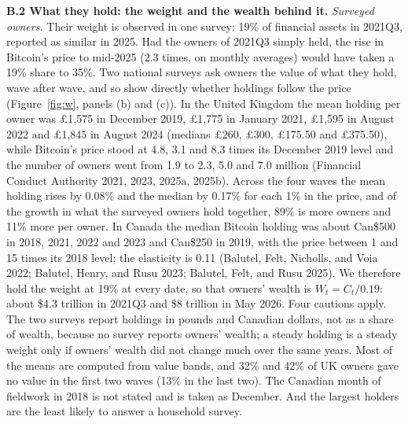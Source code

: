 \documentclass[11pt]{article}
\begin{document}
\textbf{B.2 What they hold: the weight and the wealth behind it.} \emph{Surveyed owners.} Their weight is observed in one survey: 19\% of financial assets in 2021Q3, reported as similar in 2025. Had the owners of 2021Q3 simply held, the rise in Bitcoin's price to mid-2025 (2.3 times, on monthly averages) would have taken a 19\% share to 35\%. Two national surveys ask owners the value of what they hold, wave after wave, and so show directly whether holdings follow the price (Figure~\ref{fig:w}, panels (b) and (c)). In the United Kingdom the mean holding per owner was \pounds 1,575 in December 2019, \pounds 1,775 in January 2021, \pounds 1,595 in August 2022 and \pounds 1,845 in August 2024 (medians \pounds 260, \pounds 300, \pounds 175.50 and \pounds 375.50), while Bitcoin's price stood at 4.8, 3.1 and 8.3 times its December 2019 level and the number of owners went from 1.9 to 2.3, 5.0 and 7.0 million (Financial Conduct Authority 2021, 2023, 2025a, 2025b). Across the four waves the mean holding rises by 0.08\% and the median by 0.17\% for each 1\% in the price, and of the growth in what the surveyed owners hold together, 89\% is more owners and 11\% more per owner. In Canada the median Bitcoin holding was about Can\$500 in 2018, 2021, 2022 and 2023 and Can\$250 in 2019, with the price between 1 and 15 times its 2018 level; the elasticity is 0.11 (Balutel, Felt, Nicholls, and Voia 2022; Balutel, Henry, and Rusu 2023; Balutel, Felt, and Rusu 2025). We therefore hold the weight at 19\% at every date, so that owners' wealth is $W_t = C_t/0.19$: about \$4.3 trillion in 2021Q3 and \$8 trillion in May 2026. Four cautions apply. The two surveys report holdings in pounds and Canadian dollars, not as a share of wealth, because no survey reports owners' wealth; a steady holding is a steady weight only if owners' wealth did not change much over the same years. Most of the means are computed from value bands, and 32\% and 42\% of UK owners gave no value in the first two waves (13\% in the last two). The Canadian month of fieldwork in 2018 is not stated and is taken as December. And the largest holders are the least likely to answer a household survey.
\end{document}
